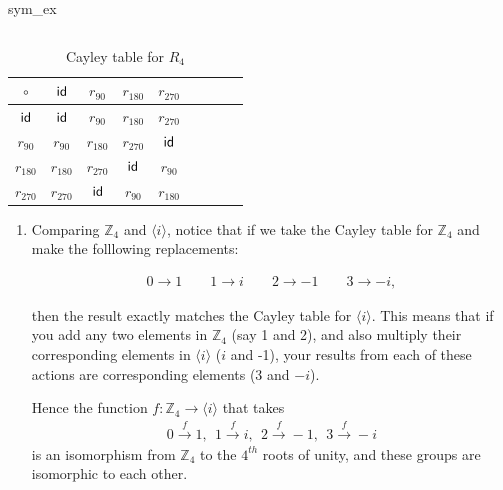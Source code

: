 \begin{example}{sym_ex}
\begin{table}[H]
{\begin{center}
\begin{tabular}{c|cccccccc}
\end{tabular}
\end{center}
}
\end{table}

\begin{table}[H]
\caption{Cayley table for $R_4$}
\label{4_rotations_table}
{\small
\begin{center}
\begin{tabular}{c|cccccccc}
$\circ$ & $\sf{id}$ & $r_{90}$ & $r_{180}$ & $r_{270}$  \\
\hline
$\sf{id}$        & $\sf{id}$ & $r_{90}$ & $r_{180}$ & $r_{270}$  \\
$r_{90}$       & $r_{90}$ & $r_{180}$ & $r_{270}$ & $\sf{id}$  \\
$r_{180}$       & $r_{180}$ & $r_{270}$ & $\sf{id}$ & $r_{90}$ \\
$r_{270}$       & $r_{270}$ & $\sf{id}$ & $r_{90}$ & $r_{180}$ \\

\end{tabular}
\end{center}
}
\end{table}

\begin{enumerate}[(1)]
\item
Comparing ${\mathbb Z_4}$ and $\langle i \rangle$, notice that if we take the Cayley table for ${\mathbb Z_4}$ and make the folllowing replacements: 

\begin{align*}
  0 \rightarrow 1 \qquad
    1 \rightarrow i \qquad
    2 \rightarrow -1 \qquad
    3 \rightarrow -i, 
\end{align*}
    
then the result exactly matches the Cayley table for $\langle i \rangle$.  This means that if you add any two elements in ${\mathbb Z_4}$ (say 1 and 2), and also multiply their corresponding elements in $\langle i \rangle$ ($i$ and -1), your results from each of these actions are corresponding elements (3 and $-i$).


Hence the function $f: {\mathbb Z_4} \longrightarrow \langle i \rangle$  that takes 
\begin{align*}
    0 \xrightarrow{f} 1 ,~~     1 \xrightarrow{f} i,~~    2 \xrightarrow{f} -1,~~   3 \xrightarrow{f} -i  
\end{align*}
 is an isomorphism from ${\mathbb Z_4}$ to the $4^{th}$ roots of unity, and these groups are isomorphic to each other.


\end{enumerate}
\end{example}
